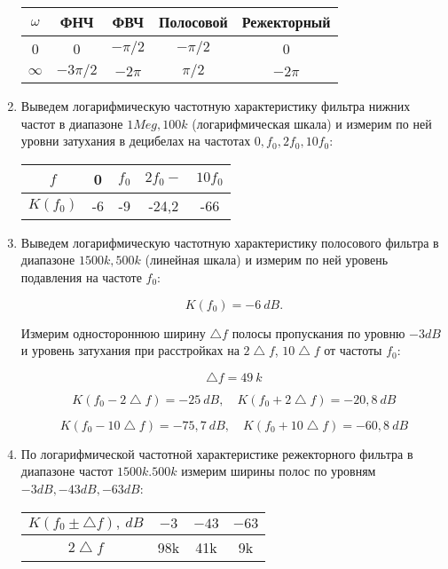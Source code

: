 \documentclass[a4paper, 12pt]{article}%
\begin{document}
\begin{enumerate}
\begin{center}
\begin{tabular}{|c|c|c|c|c|}
\hline 
$\omega$ & ФНЧ & ФВЧ & Полосовой & Режекторный \\ 
\hline 
0 & 0 & $-\pi/2$ & $-\pi/2$ & 0 \\ 
\hline 
$\infty$ & $-3\pi/2$ & $-2\pi$ & $\pi/2$ & $-2\pi$ \\ 
\hline 
\end{tabular}
\end{center} 

\item Выведем логарифмическую частотную характеристику фильтра нижних частот в диапазоне $1Meg,100k$ (логарифмическая шкала) и измерим по ней уровни затухания в децибелах на частотах $0, f_0, 2f_0, 10f_0$:

\begin{center}
\begin{tabular}{|c|c|c|c|c|}
\hline 
$f$ & 0 & $f_0$ & $2f_0-$ & $10f_0$ \\ 
\hline 
$K(f_0)$ & -6 & -9 & -24,2 & -66 \\ 
\hline 
\end{tabular} 
\end{center}

\item Выведем логарифмическую частотную характеристику полосового фильтра в диапазоне $1500k,500k$ (линейная шкала) и измерим по ней уровень подавления на частоте $f_0$:

\[K(f_0) = -6 \: dB.\]

Измерим одностороннюю ширину $\bigtriangleup f$ полосы пропускания по уровню $-3 dB$ и уровень затухания при расстройках на $2\bigtriangleup f$, $10\bigtriangleup f$ от частоты $f_0$:

\[\bigtriangleup f = 49\: k\]

\[K(f_0 - 2\bigtriangleup f) = -25 \: dB, \quad K(f_0 + 2\bigtriangleup f) = -20,8 \: dB\]

\[K(f_0 - 10\bigtriangleup f) = -75,7 \: dB, \quad K(f_0 + 10\bigtriangleup f) = -60,8 \: dB\]

\item По логарифмической частотной характеристике режекторного фильтра в диапазоне частот $1500k.500k$ измерим ширины полос по уровням $-3dB, -43dB, -63dB$:

\begin{center}
\begin{tabular}{|c|c|c|c|}
\hline 
$K(f_0 \pm \bigtriangleup f), \: dB$ & $-3$ & $-43$ & $-63$ \\ 
\hline 
$2\bigtriangleup f$ & 98k & 41k & 9k \\ 
\hline 
\end{tabular} 
\end{center}

\end{enumerate}
\end{document}
